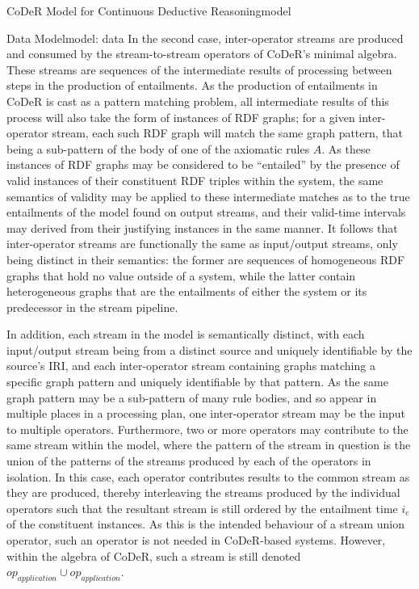 \begin{nestedsection}{CoDeR Model for Continuous Deductive Reasoning}{model}
\begin{nestedsection}{Data Model}{model: data}
		In the second case, inter-operator streams are produced and consumed by the stream-to-stream operators of CoDeR's minimal algebra.
		These streams are sequences of the intermediate results of processing between steps in the production of entailments.
		As the production of entailments in CoDeR is cast as a pattern matching problem, all intermediate results of this process will also take the form of instances of RDF graphs;
		for a given inter-operator stream, each such RDF graph will match the same graph pattern, that being a sub-pattern of the body of one of the axiomatic rules $A$.
		As these instances of RDF graphs may be considered to be ``entailed'' by the presence of valid instances of their constituent RDF triples within the system, the same semantics of validity may be applied to these intermediate matches as to the true entailments of the model found on output streams, and their valid-time intervals may derived from their justifying instances in the same manner.
		It follows that inter-operator streams are functionally the same as input/output streams, only being distinct in their semantics:
		the former are sequences of homogeneous RDF graphs that hold no value outside of a system, while the latter contain heterogeneous graphs that are the entailments of either the system or its predecessor in the stream pipeline.

		In addition, each stream in the model is semantically distinct, with each input/output stream being from a distinct source and uniquely identifiable by the source's IRI, and each inter-operator stream containing graphs matching a specific graph pattern and uniquely identifiable by that pattern.
		As the same graph pattern may be a sub-pattern of many rule bodies, and so appear in multiple places in a processing plan, one inter-operator stream may be the input to multiple operators.
		Furthermore, two or more operators may contribute to the same stream within the model, where the pattern of the stream in question is the union of the patterns of the streams produced by each of the operators in isolation.
		In this case, each operator contributes results to the common stream as they are produced, thereby interleaving the streams produced by the individual operators such that the resultant stream is still ordered by the entailment time $i_e$ of the constituent instances.
		As this is the intended behaviour of a stream union operator, such an operator is not needed in CoDeR-based systems.
		However, within the algebra of CoDeR, such a stream is still denoted ${op_{application} \cup op_{application}}$.


\end{nestedsection}
\end{nestedsection}
